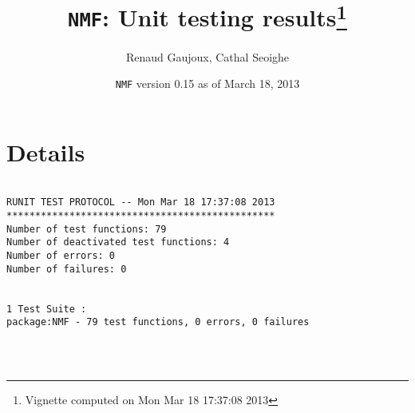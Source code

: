 \documentclass[10pt]{article}
\author{Renaud Gaujoux, Cathal Seoighe}
\title{\texttt{NMF}: Unit testing results\footnote{Vignette computed  on Mon Mar 18 17:37:08 2013}}
\date{\texttt{NMF} version 0.15 as of March 18, 2013}
\begin{document}
\maketitle

\section{Details}
\begin{verbatim}

RUNIT TEST PROTOCOL -- Mon Mar 18 17:37:08 2013 
*********************************************** 
Number of test functions: 79 
Number of deactivated test functions: 4 
Number of errors: 0 
Number of failures: 0 

 
1 Test Suite : 
package:NMF - 79 test functions, 0 errors, 0 failures




\end{verbatim}
\end{document}
